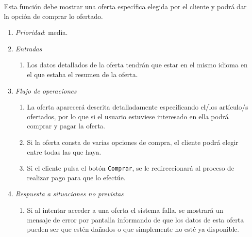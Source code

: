 	Esta función debe mostrar una oferta específica elegida por el cliente y podrá dar la opción de comprar lo ofertado.
	
\begin{enumerate}
	\item \textit{Prioridad}: media.
	\item \textit{Entradas}
	\begin{enumerate}
		\item Los datos detallados de la oferta tendrán que estar en el mismo idioma en el que estaba el resumen de la oferta.
	\end{enumerate}
	\item \textit{Flujo de operaciones}
	\begin{enumerate}
		\item La oferta aparecerá descrita detalladamente especificando el/los artículo/s ofertados, por lo que si el usuario estuviese interesado en ella podrá comprar y pagar la oferta.
		\item Si la oferta consta de varias opciones de compra, el cliente podrá elegir entre todas las que haya.
		\item Si el cliente pulsa el botón \verb|Comprar|, se le redireccionará al proceso de realizar pago para que lo efectúe.
	\end{enumerate}
	\item \textit{Respuesta a situaciones no previstas}
	\begin{enumerate}
		\item Si al intentar acceder a una oferta el sistema falla, se mostrará un mensaje de error por pantalla informando de que los datos de esta oferta pueden ser que estén dañados o que simplemente no esté ya disponible. 
	\end{enumerate}
\end{enumerate}
